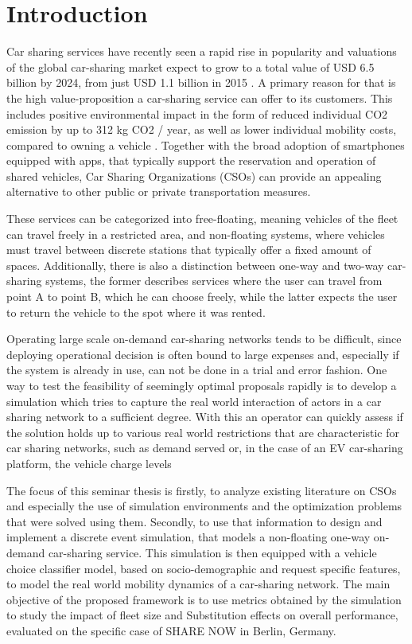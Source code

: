 \clearpage
\section{Introduction}
\label{sec:Intro}

Car sharing services have recently seen a rapid rise in popularity 
and valuations of the global car-sharing market expect to grow to
a total value of USD 6.5 billion by 2024, from just USD 1.1 billion in 2015 . 
A primary reason for that is the high value-proposition a car-sharing service
can offer to its customers. This includes positive environmental impact in the form of
reduced individual CO2 emission by up to 312 kg CO2 / year, as well as
lower individual mobility costs, compared to owning a vehicle . Together with the
broad adoption of smartphones equipped with apps, that typically
support the reservation and operation of shared vehicles, Car Sharing Organizations (CSOs)
can provide an appealing alternative to other public or private transportation measures.

These services can be categorized into free-floating, meaning vehicles of the fleet
can travel freely in a restricted area, and non-floating systems, where vehicles must travel
between discrete stations that typically offer a fixed amount of spaces. Additionally,
there is also a distinction between one-way and two-way car-sharing systems, the former
describes services where the user can travel from point A to point B, which he can choose
freely, while the latter expects the user to return the vehicle to the spot where it was
rented.

Operating large scale on-demand car-sharing networks tends to be difficult, since
deploying operational decision is often bound to large expenses and, especially if the
system is already in use, can not be done in a trial and error fashion. One way to test the feasibility of
seemingly optimal proposals rapidly is to develop a simulation which tries to capture the real world
interaction of actors in a car sharing network to a sufficient degree. With this an operator can 
quickly assess if the solution holds up to various real world restrictions that are characteristic
for car sharing networks, such as demand served or, in the case of an EV car-sharing platform, the vehicle
charge levels 

The focus of this seminar thesis is firstly, to analyze existing literature on CSOs and especially
the use of simulation environments and the optimization problems that were solved using them.
Secondly, to use that information to design
and implement a discrete event simulation, that models a non-floating one-way on-demand
car-sharing service. This simulation is then equipped with a vehicle choice
classifier model, based on socio-demographic and request specific features,
to model the real world mobility dynamics of a car-sharing network.
The main objective of the proposed framework is to use metrics obtained by the simulation
to study the impact of fleet size and Substitution effects on overall performance,
evaluated on the specific case of SHARE NOW in Berlin, Germany.
